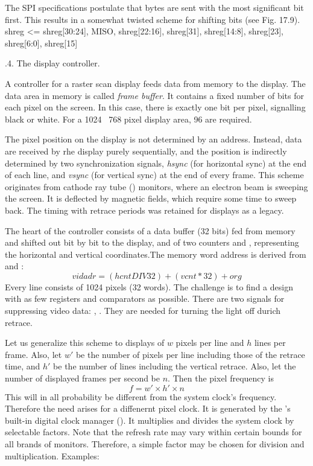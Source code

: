 {The SPI specifications postulate that bytes are sent with the most significant bit first. This results in a somewhat twisted scheme for shifting bits (see Fig. 17.9).
\begintt
shreg <= {shreg[30:24], MISO, shreg[22:16], shreg[31],
          shreg[14:8], shreg[23], shreg[6:0], shreg[15]}
\endtt


.4. The display controller.

A controller for a raster scan display feeds data from memory to the display. The data area in memory is called \emph{frame buffer}. It contains a fixed number of bits for each pixel on the screen. In this case, there is exactly one bit per pixel, signalling black or white. For a 1024 \times\ 768 pixel display area, 96 \KB are required.

The pixel position on the display is not determined by an address. Instead, data are received by rhe display purely sequentially, and the position is indirectly determined by two synchronization signals, \emph{hsync} (for horizontal sync) at the end of each line, and \emph{vsync} (for vertical sync) at the end of every frame. This scheme originates from cathode ray tube () monitors, where an electron beam is sweeping the screen. It is deflected by magnetic fields, which require some time to sweep back. The timing with retrace periods was retained for  displays as a legacy.

The heart of the controller consists of a data buffer (32 bits) fed from memory and shifted out bit by bit to the display, and of two counters  and , representing the horizontal and vertical coordinates.The memory word address is derived from  and :
$$vidadr = (hcnt DIV 32) + (vcnt * 32) + org$$
Every line consists of 1024 pixels (32 words). The challenge is to find a design with as few registers and comparators as possible. There are two signals for suppressing video data: , . They are needed for turning the light off durich retrace.


Let us generalize this scheme to displays of $w$ pixels per line and $h$ lines per frame. Also, let $w'$ be the number of pixels per line including those of the retrace time, and $h'$ be the number of lines including the vertical retrace. Also, let the number of displayed frames per second be $n$. Then the pixel frequency is
$$f = w' \times h' \times n$$
This will in all probability be different from the system clock's frequency. Therefore the need arises for a diffenernt pixel clock. It is generated by the \FPGA's built-in digital clock manager (). It multiplies and divides the system clock by selectable factors. Note that the refresh rate may vary within certain bounds for all brands of monitors. Therefore, a simple factor may be chosen for division and multiplication. Examples:

}
